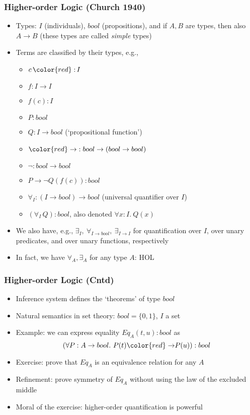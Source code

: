 \documentclass[handout]{beamer}
\newcommand{\set}[1]{\{#1\}}
\begin{document}
\frame
  {

    \frametitle{Higher-order Logic (Church 1940)}

    \begin{itemize}[<+->]
          \item Types: $I$ (individuals), $bool$ (propositions), and if $A,B$ are
          types, then also $A\to B$ (these types are called \emph{simple} types)
          \item Terms are classified by their types, e.g.,
            \begin{itemize}[<+->]
            \item $c\,{\color{red}:}\,I$
            \item $f:I\to I$
            \item $f(c) : I$
            \item $P: bool$
            \item $Q:I\to bool$ (`propositional function')
            \item ${\color{red}\to}:bool\to (bool\to bool)$
            \item ${\neg}: bool\to bool $
            \item $P \to \neg Q(f(c)) : bool$
            \item $\forall_I :(I\to bool)\to bool$ (universal quantifier over $I$)
            \item $(\forall_I\,Q):bool$, also denoted $\forall x{:}I.~Q(x)$
            \end{itemize}
          \item We also have, e.g., $\exists_{I},~\forall_{I\to bool},~\exists_{I\to I}$ for quantification
          over $I$, over unary predicates, and over unary functions, respectively
          \item In fact, we have $\forall_A,\exists_A$ for any type $A$: {\color{red}HO}L
    \end{itemize}
  }

\frame
  {

    \frametitle{Higher-order Logic (Cntd)}

    \begin{itemize}[<+->]
         \item Inference system defines the `theorems' of type $bool$
        \item Natural semantics in set theory: $bool=\set{0,1}$, $I$ a set
        \item Example: we can express equality $Eq_A(t,u): bool$ as
          \[(\forall P:A\to bool.~P(t){\color{red}\to} P(u)) : bool\]
        \item Exercise: prove that $Eq_A$ is an equivalence relation for any $A$
        \item Refinement: prove symmetry of $Eq_A$ without using the law of the excluded middle
        \item Moral of the exercise: higher-order quantification is powerful
    \end{itemize}

  }
\end{document}
